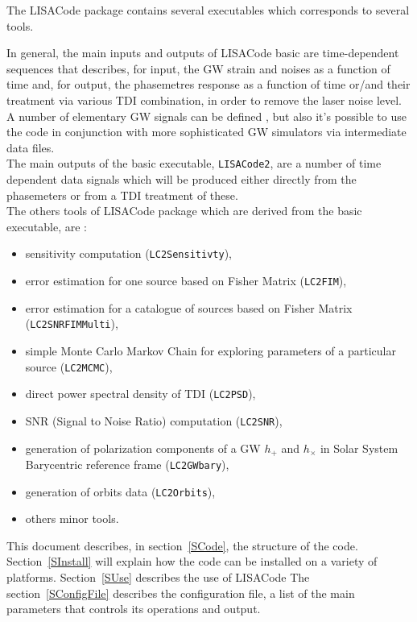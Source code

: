 \documentclass[a4paper,english,12pt]{article}
\newcommand{\cm}[1]{\texttt{#1}}
\begin{document}
The LISACode package contains several executables which corresponds to several tools.

In general, the main inputs and outputs of LISACode basic are time-dependent sequences that describes, for input, the GW strain and noises as a function of time and, for output, the phasemetres response as a function of time or/and their treatment via various TDI combination, in order to remove the laser noise level. \\

A number of  elementary GW signals can be defined , but also it's possible to use the code in conjunction with more sophisticated GW simulators via intermediate data files. \\

The main outputs of the basic executable, \cm{LISACode2}, are a number of time dependent data signals which will be produced either directly from the phasemeters or from a TDI treatment of these. \\

The others tools of LISACode package which are derived from the basic executable, are : 
\begin{itemize}
\item sensitivity computation (\cm{LC2Sensitivty}),
\item error estimation for one source based on Fisher Matrix (\cm{LC2FIM}),
\item error estimation for a catalogue of sources based on Fisher Matrix (\cm{LC2SNRFIMMulti}),
\item simple Monte Carlo Markov Chain for exploring parameters of a particular source (\cm{LC2MCMC}),
\item direct power spectral density of TDI (\cm{LC2PSD}),
\item SNR (Signal to Noise Ratio) computation (\cm{LC2SNR}),
\item generation of polarization components of a GW $h_{+}$ and $h_{\times}$ in Solar System Barycentric reference frame (\cm{LC2GWbary}),
\item generation of orbits data (\cm{LC2Orbits}),
\item others minor tools. 
\end{itemize}


This document describes, in section~\ref{SCode}, the structure of the code. Section~\ref{SInstall}  will explain how the code can be installed on a variety of platforms. Section~\ref{SUse} describes the use of LISACode The section~\ref{SConfigFile} describes the configuration file, a list of the main parameters that controls its operations and output.  \\
\end{document}
